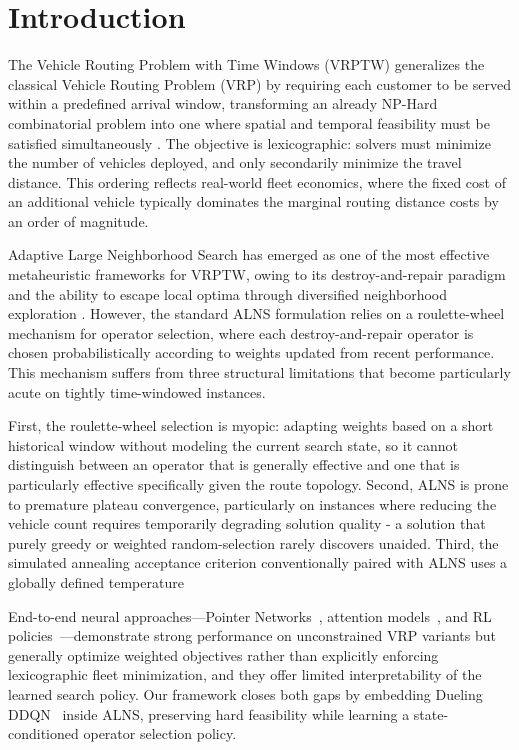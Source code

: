 \documentclass[conference]{IEEEtran}
\begin{document}
\section{Introduction}
\label{sec:intro}

The Vehicle Routing Problem with Time Windows (VRPTW) generalizes the classical Vehicle Routing Problem (VRP) by requiring each customer to be served within a predefined arrival window, transforming an already NP-Hard combinatorial problem into one where spatial and temporal feasibility must be satisfied simultaneously \cite{Dantzig1959, Solomon1987}.
The objective is lexicographic: solvers must minimize the number of vehicles deployed, and only secondarily minimize the travel distance. This ordering reflects real-world fleet economics, where the fixed cost of an additional vehicle typically dominates the marginal routing distance costs by an order of magnitude.

Adaptive Large Neighborhood Search has emerged as one of the most effective metaheuristic frameworks for VRPTW, owing to its destroy-and-repair paradigm and the ability to escape local optima through diversified neighborhood exploration \cite{shaw1998using, Ropke2006, pisinger2007general}. However, the standard ALNS formulation relies on a roulette-wheel mechanism for operator selection, where each destroy-and-repair operator is chosen probabilistically according to weights updated from recent performance. This mechanism suffers from three structural limitations that become particularly acute on tightly time-windowed instances.

First, the roulette-wheel selection is myopic: adapting weights based on a short historical window without modeling the current search state, so it cannot distinguish between an operator that is generally effective and one that is particularly effective specifically given the route topology.
Second, ALNS is prone to premature plateau convergence, particularly on instances where reducing the vehicle count requires temporarily degrading solution quality - a solution that purely greedy or weighted random-selection rarely discovers unaided.
Third, the simulated annealing acceptance criterion conventionally paired with ALNS uses a globally defined temperature

End-to-end neural approaches---Pointer Networks~\cite{vinyals2015pointer},
attention models~\cite{kool2019attention}, and RL
policies~\cite{nazari2018reinforcement}---demonstrate strong performance on
unconstrained VRP variants but generally optimize weighted objectives rather
than explicitly enforcing lexicographic fleet minimization, and they offer
limited interpretability of the learned search policy.
Our framework closes both gaps by embedding Dueling
DDQN~\cite{wang2016dueling} inside ALNS, preserving hard feasibility while
learning a state-conditioned operator selection policy.
\end{document}
